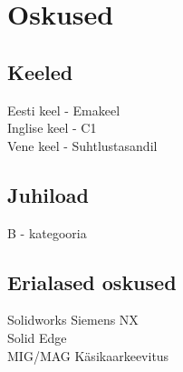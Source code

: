 \documentclass[letterpaper]{deedy-resume} %
\begin{document}
\begin{minipage}[t]{0.33\textwidth}

\section{Oskused}

\subsection{Keeled}

Eesti keel - Emakeel \\
Inglise keel - C1 \\
Vene keel - Suhtlustasandil \\

\sectionspace %


\subsection{Juhiload}

B - kategooria \\

\sectionspace %

\subsection{Erialased oskused}

\sectionspace

Solidworks \textbullet{} Siemens NX \textbullet{}\\
Solid Edge\\
MIG/MAG \textbullet{} Käsikaarkeevitus \\

\sectionspace


\sectionspace



\sectionspace %


\end{minipage} %
\end{document}
